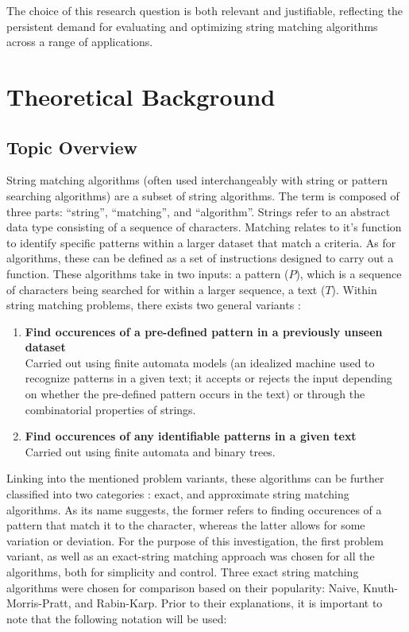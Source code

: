 \documentclass[12pt]{article}
\begin{document}
The choice of this research question is both relevant and justifiable, reflecting the persistent demand for evaluating and optimizing string matching algorithms across a range of applications.

\section{Theoretical Background} %
\subsection{Topic Overview}
\parencite{3} String matching algorithms (often used interchangeably with string or pattern searching
algorithms) are a subset of string algorithms. The term is composed of three parts:
“string”, “matching”, and “algorithm”. Strings refer to an abstract data type consisting
of a sequence of characters. Matching relates to it's function to identify specific patterns
within a larger dataset that match a criteria. As for algorithms, these can be defined as a set of instructions designed to carry out a function. These algorithms take in two
inputs: a pattern ($P$), which is a sequence of characters being searched for within a larger
sequence, a text ($T$). Within string matching problems, there exists two general variants
\parencite{2}:

\begin{enumerate}
	\item \textbf{Find occurences of a pre-defined pattern in a previously unseen dataset} \\
	Carried out using finite automata models \parencite{2} (an idealized machine used to recognize
	patterns in a given text; it accepts or rejects the input depending on whether the
	pre-defined pattern occurs in the text) or through the combinatorial properties of
	strings.
	\item \textbf{Find occurences of any identifiable patterns in a given text} \\
	Carried out using finite automata and binary trees.
\end{enumerate}

Linking into the mentioned problem variants, these algorithms can be further classified into two categories \parencite{1}: exact, and approximate string matching algorithms. As
its name suggests, the former refers to finding occurences of a pattern that match it to
the character, whereas the latter allows for some variation or deviation. For the purpose
of this investigation, the first problem variant, as well as an exact-string matching approach was chosen for all the algorithms, both for simplicity and control. Three exact
string matching algorithms were chosen for comparison based on their popularity: Naive,
Knuth-Morris-Pratt, and Rabin-Karp. Prior to their explanations, it is important to note
that the following notation will be used:
\end{document}
